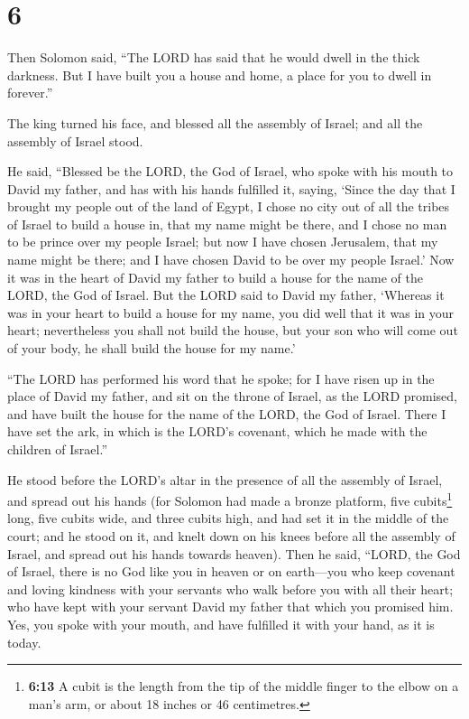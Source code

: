 \hypertarget{section-5}{%
\section{6}\label{section-5}}

 Then Solomon said, ``The LORD has said that he would
dwell in the thick darkness.  But I have built you a house
and home, a place for you to dwell in forever.''

 The king turned his face, and blessed all the assembly of
Israel; and all the assembly of Israel stood.

 He said, ``Blessed be the LORD, the God of Israel, who
spoke with his mouth to David my father, and has with his hands
fulfilled it, saying,  `Since the day that I brought my
people out of the land of Egypt, I chose no city out of all the tribes
of Israel to build a house in, that my name might be there, and I chose
no man to be prince over my people Israel;  but now I have
chosen Jerusalem, that my name might be there; and I have chosen David
to be over my people Israel.'  Now it was in the heart of
David my father to build a house for the name of the LORD, the God of
Israel.  But the LORD said to David my father, `Whereas it
was in your heart to build a house for my name, you did well that it was
in your heart;  nevertheless you shall not build the
house, but your son who will come out of your body, he shall build the
house for my name.'

 ``The LORD has performed his word that he spoke; for I
have risen up in the place of David my father, and sit on the throne of
Israel, as the LORD promised, and have built the house for the name of
the LORD, the God of Israel.  There I have set the ark,
in which is the LORD's covenant, which he made with the children of
Israel.''

 He stood before the LORD's altar in the presence of all
the assembly of Israel, and spread out his hands  (for
Solomon had made a bronze platform, five cubits\footnote{\textbf{6:13} A
  cubit is the length from the tip of the middle finger to the elbow on
  a man's arm, or about 18 inches or 46 centimetres.} long, five cubits
wide, and three cubits high, and had set it in the middle of the court;
and he stood on it, and knelt down on his knees before all the assembly
of Israel, and spread out his hands towards heaven). 
Then he said, ``LORD, the God of Israel, there is no God like you in
heaven or on earth---you who keep covenant and loving kindness with your
servants who walk before you with all their heart;  who
have kept with your servant David my father that which you promised him.
Yes, you spoke with your mouth, and have fulfilled it with your hand, as
it is today.


